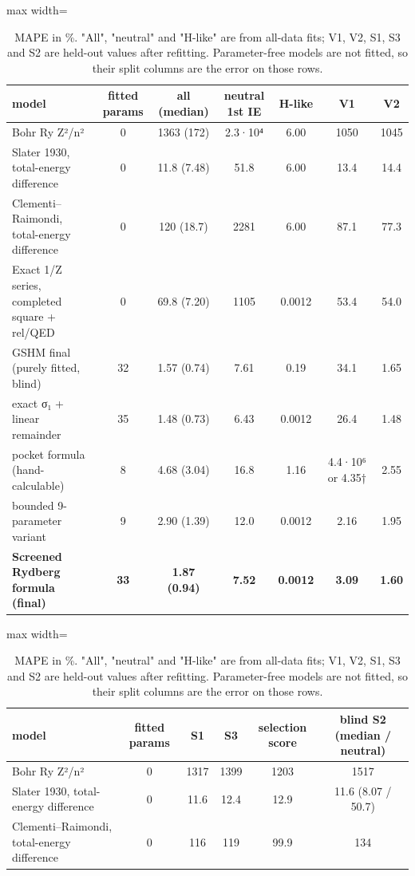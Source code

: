 \documentclass[aps,pra,preprint,notitlepage,superscriptaddress,amsmath,amssymb]{revtex4-2}
\begin{document}
\begin{table}[htbp]
\caption{MAPE in \%. "All", "neutral" and "H-like" are from all-data fits; V1, V2, S1, S3 and S2 are held-out values after refitting. Parameter-free models are not fitted, so their split columns are the error on those rows.}
\scriptsize\linespread{1}\selectfont\setlength{\tabcolsep}{5pt}\renewcommand{\arraystretch}{1.1}
\begin{adjustbox}{max width=\linewidth}
\begin{tabular}{lcccccc}
\hline\hline
model & fitted params & all (median) & neutral 1st IE & H-like & V1 & V2 \\
\hline
Bohr Ry Z²/n² & 0 & 1363 (172) & 2.3·10⁴ & 6.00 & 1050 & 1045 \\
Slater 1930, total-energy difference & 0 & 11.8 (7.48) & 51.8 & 6.00 & 13.4 & 14.4 \\
Clementi–Raimondi, total-energy difference & 0 & 120 (18.7) & 2281 & 6.00 & 87.1 & 77.3 \\
Exact 1/Z series, completed square + rel/QED & 0 & 69.8 (7.20) & 1105 & 0.0012 & 53.4 & 54.0 \\
GSHM final (purely fitted, blind) & 32 & 1.57 (0.74) & 7.61 & 0.19 & 34.1 & 1.65 \\
exact σ₁ + linear remainder & 35 & 1.48 (0.73) & 6.43 & 0.0012 & 26.4 & 1.48 \\
pocket formula (hand-calculable) & 8 & 4.68 (3.04) & 16.8 & 1.16 & 4.4·10⁶ or 4.35† & 2.55 \\
bounded 9-parameter variant & 9 & 2.90 (1.39) & 12.0 & 0.0012 & 2.16 & 1.95 \\
\textbf{Screened Rydberg formula (final)} & \textbf{33} & \textbf{1.87 (0.94)} & \textbf{7.52} & \textbf{0.0012} & \textbf{3.09} & \textbf{1.60} \\
\hline\hline
\end{tabular}
\end{adjustbox}
\medskip
\begin{adjustbox}{max width=\linewidth}
\begin{tabular}{lccccc}
\hline\hline
model & fitted params & S1 & S3 & selection score & \textbf{blind S2} (median / neutral) \\
\hline
Bohr Ry Z²/n² & 0 & 1317 & 1399 & 1203 & 1517 \\
Slater 1930, total-energy difference & 0 & 11.6 & 12.4 & 12.9 & 11.6 (8.07 / 50.7) \\
Clementi–Raimondi, total-energy difference & 0 & 116 & 119 & 99.9 & 134 \\

\end{tabular}
\end{adjustbox}
\end{table}
\end{document}
